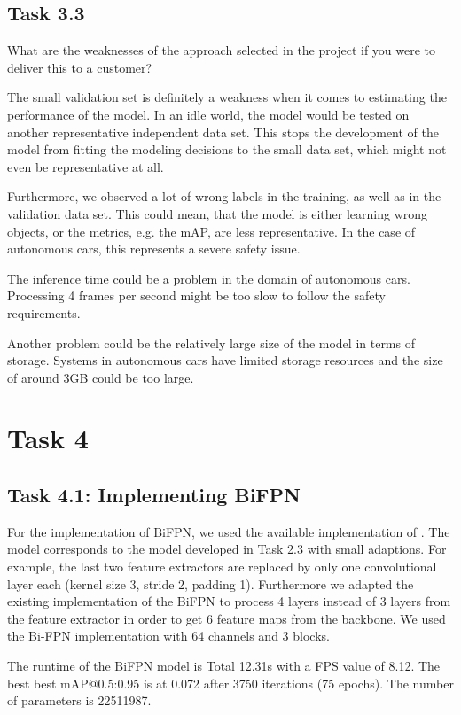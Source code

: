\documentclass{article}
\begin{document}
\subsection*{Task 3.3}
What are the weaknesses of the approach selected in the project if you were to deliver this to a customer?

The small validation set is definitely a weakness when it comes to estimating the performance of the model. In an idle world, the model would be tested on another representative independent data set. This stops the development of the model from fitting the modeling decisions to the small data set, which might not even be representative at all.

Furthermore, we observed a lot of wrong labels in the training, as well as in the validation data set. This could mean, that the model is either learning wrong objects, or the metrics, e.g. the mAP, are less representative. In the case of autonomous cars, this represents a severe safety issue.

The inference time could be a problem in the domain of autonomous cars. Processing 4 frames per second might be too slow to follow the safety requirements.

Another problem could be the relatively large size of the model in terms of storage. Systems in autonomous cars have limited storage resources and the size of around 3GB could be too large.


\section*{Task 4}

\subsection*{Task 4.1: Implementing BiFPN}

For the implementation of BiFPN, we used the available implementation of \cite{efficientdet}. The model corresponds to the model developed in Task 2.3 with small adaptions. For example, the last two feature extractors are replaced by only one convolutional layer each (kernel size 3, stride 2, padding 1). Furthermore we adapted the existing implementation of the BiFPN to process 4 layers instead of 3 layers from the feature extractor in order to get 6 feature maps from the backbone. We used the Bi-FPN implementation with 64 channels and 3 blocks.

The runtime of the BiFPN model is Total 12.31s with a FPS value of 8.12. The best best mAP@0.5:0.95 is at 0.072 after 3750 iterations (75 epochs). The number of parameters is 22511987.
\end{document}
